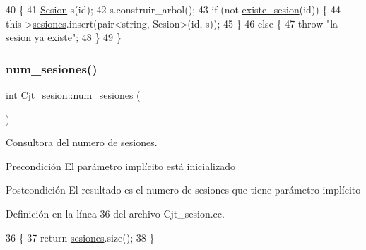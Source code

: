 \begin{DoxyCode}
40                                         \{
41   \mbox{\hyperlink{class_sesion}{Sesion}} s(\textcolor{keywordtype}{id});
42   s.construir\_arbol();
43   \textcolor{keywordflow}{if} (not \mbox{\hyperlink{class_cjt__sesion_a405ed3806e378d1a415588e640584bbd}{existe\_sesion}}(\textcolor{keywordtype}{id})) \{
44     this->\mbox{\hyperlink{class_cjt__sesion_abac1c2ee3cccc598a8274c7da869aa9b}{sesiones}}.insert(pair<string, Sesion>(\textcolor{keywordtype}{id}, s));
45   \}
46   \textcolor{keywordflow}{else} \{
47     \textcolor{keywordflow}{throw} \textcolor{stringliteral}{"la sesion ya existe"};
48   \}
49 \}
\end{DoxyCode}
\mbox{\label{class_cjt__sesion_aa885f9672e699d82dcd22aaa26d1ada8}} 
\subsubsection{\texorpdfstring{num\+\_\+sesiones()}{num\_sesiones()}}
{\footnotesize\ttfamily int Cjt\+\_\+sesion\+::num\+\_\+sesiones (\begin{DoxyParamCaption}{ }\end{DoxyParamCaption})}



Consultora del numero de sesiones. 

\begin{DoxyPrecond}{Precondición}
El parámetro implícito está inicializado 
\end{DoxyPrecond}
\begin{DoxyPostcond}{Postcondición}
El resultado es el numero de sesiones que tiene parámetro implícito 
\end{DoxyPostcond}


Definición en la línea 36 del archivo Cjt\+\_\+sesion.\+cc.


\begin{DoxyCode}
36                              \{
37     \textcolor{keywordflow}{return} \mbox{\hyperlink{class_cjt__sesion_abac1c2ee3cccc598a8274c7da869aa9b}{sesiones}}.size();
38 \}
\end{DoxyCode}
\mbox{\label{class_cjt__sesion_aade2be6a90f0135b38342f877cc26ae6}} 
